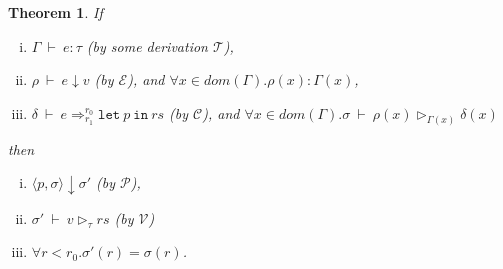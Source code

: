 \documentclass[a4paper]{article}
\newtheorem{thm}[equation]{Theorem}
\def\Eva{\downarrow}
\def\Ra{\Rightarrow}
\def\Env{\ \vdash\ }
\def\Sgm{\sigma}
\def\MC{\mathcal{C}}
\def\ME{\mathcal{E}}
\def\MP{\mathcal{P}}
\def\MT{\mathcal{T}}
\def\MV{\mathcal{V}}
\def\Eval#1#2#3{#1 \Env #2 \Eva #3 }
\def\TaSem#1#2#3{\langle #1,#2 \rangle \Eva #3}
\def\Talet#1#2{\mathtt{let} \ #1 \ \mathtt{in} \ #2}
\def\Trans#1#2#3#4#5{#1 \Env #2 \Ra^{#4}_{#5} #3}
\def\Type#1#2#3{#1 \Env #2 : #3 }
\def\ValRep#1#2#3#4{#1 \Env #2 \triangleright_{#4} #3}
\begin{document}
\begin{thm}
	If 
	\begin{enumerate}[(i)]
		\item $\Type{\Gamma}{e}{\tau}$ (by some derivation $\MT$),
		\item $\Eval{\rho}{e}{v}$ (by $\ME$), and $\forall x \in dom(\Gamma). \rho(x):\Gamma(x)$, 
		\item $\Trans{\delta}{e}{\Talet{p}{rs}}{r_0}{r_1}$ (by $\MC$),
		and $\forall x \in dom(\Gamma).\ValRep{\Sgm}{\rho(x)}{\delta(x)}{\Gamma(x)}$
	\end{enumerate}
	then 
	\begin{enumerate}[(i)]
		\item $\TaSem{p}{\Sgm}{\Sgm'}$ (by $\MP$),
		\item  $\ValRep{\Sgm'}{v}{rs}{\tau}$ (by $\MV$)
		\item $\forall r < r_0.\Sgm'(r) = \Sgm(r) $. 
	\end{enumerate} 
\end{thm}
\end{document}
